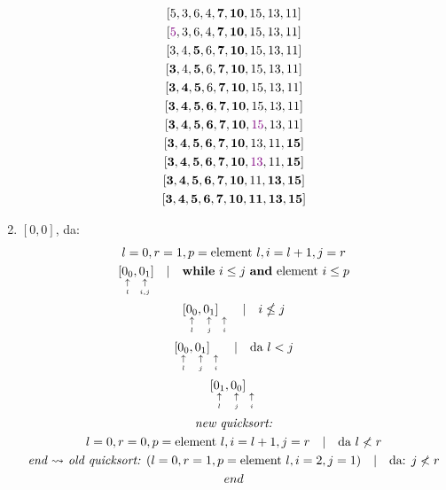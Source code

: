 \documentclass[sectionformat = exercise]{gadsescript}
\begin{document}
\begin{enumerate}[label=\alph*)]
\begin{multline*}
			[{\color{violet}7}, 5, 3, 6, 4, \mathbf{10}, 15, 13, 11]\\
			[5, 3, 6, 4, \mathbf{7}, \mathbf{10}, 15, 13, 11]\\
			[{\color{violet}5}, 3, 6, 4, \mathbf{7}, \mathbf{10}, 15, 13, 11]\\
			[3, 4, \mathbf{5}, 6, \mathbf{7}, \mathbf{10}, 15, 13, 11]\\
			[\mathbf{3}, 4, \mathbf{5}, 6, \mathbf{7}, \mathbf{10}, 15, 13, 11]\\
			[\mathbf{3}, \mathbf{4}, \mathbf{5}, 6, \mathbf{7}, \mathbf{10}, 15, 13, 11]\\
			[\mathbf{3}, \mathbf{4}, \mathbf{5}, \mathbf{6}, \mathbf{7}, \mathbf{10}, 15, 13, 11]\\
			[\mathbf{3}, \mathbf{4}, \mathbf{5}, \mathbf{6}, \mathbf{7}, \mathbf{10}, {\color{violet}15}, 13, 11]\\
			[\mathbf{3}, \mathbf{4}, \mathbf{5}, \mathbf{6}, \mathbf{7}, \mathbf{10}, 13, 11, \mathbf{15}]\\
			[\mathbf{3}, \mathbf{4}, \mathbf{5}, \mathbf{6}, \mathbf{7}, \mathbf{10}, {\color{violet}13}, 11, \mathbf{15}]\\
			[\mathbf{3}, \mathbf{4}, \mathbf{5}, \mathbf{6}, \mathbf{7}, \mathbf{10}, 11, \mathbf{13}, \mathbf{15}]\\
			[\mathbf{3}, \mathbf{4}, \mathbf{5}, \mathbf{6}, \mathbf{7}, \mathbf{10}, \mathbf{11}, \mathbf{13}, \mathbf{15}]\\
		\end{multline*}
	\item $ [0, 0] $, da:
		\begin{multline*}
			l = 0, r = 1, p = \text{element } l, i = l + 1, j = r\\
			[\underset{\underset{l}{\uparrow}}{0_0}, \underset{\underset{i,j}{\uparrow}}{0_1}] \quad | \quad \text{\textbf{while} } i \leq j \text{ \textbf{and} } \text{element } i \leq p\\
			[\underset{\underset{l}{\uparrow}}{0_0}, \underset{\underset{j}{\uparrow}}{0_1}]\underset{\underset{i}{\uparrow}}{\phantom{0_0}} \quad | \quad i \nleq j\\
			[\underset{\underset{l}{\uparrow}}{0_0}, \underset{\underset{j}{\uparrow}}{0_1}]\underset{\underset{i}{\uparrow}}{\phantom{0_0}} \quad | \quad \text{da } l < j\\
			[\underset{\underset{l}{\uparrow}}{0_1}, \underset{\underset{j}{\uparrow}}{0_0}]\underset{\underset{i}{\uparrow}}{\phantom{0_0}}\\
			\text{\textit{new quicksort:}}\\
			l = 0, r = 0, p = \text{element } l, i = l + 1, j = r \quad | \quad \text{da } l \nless r\\
			\text{\textit{end $\rightsquigarrow$ old quicksort:} } (l = 0, r = 1, p = \text{element } l, i = 2, j = 1) \quad | \quad \text{da: } j \nless r\\
			end\\
		\end{multline*}
\end{enumerate}
\end{document}
